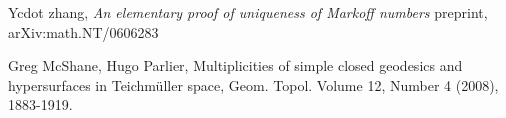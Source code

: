 \documentclass[14pt,a4paper]{amsart}
\begin{document}
 Ycdot zhang,
 \textit{ An elementary proof of uniqueness of Markoff numbers}
 preprint, arXiv:math.NT/0606283
 




Greg McShane, Hugo Parlier,
Multiplicities of simple closed geodesics and hypersurfaces in Teichmüller space,
Geom. Topol.
Volume 12, Number 4 (2008), 1883-1919.


%
%
%
%
%
%
%
%


\end{document}
